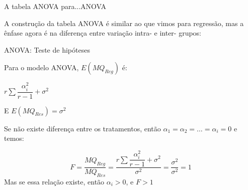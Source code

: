 \documentclass{beamer}\usepackage[]{graphicx}\usepackage[]{color}
\begin{document}
\begin{frame}{A tabela ANOVA para...ANOVA}

A construção da tabela ANOVA é similar ao que vimos para regressão, mas a ênfase agora é na diferença entre variação intra- e inter- grupos:
\vfill


\end{frame}

\begin{frame}{ANOVA: Teste de hipóteses}

Para o modelo ANOVA, $E(MQ_{Reg})$ é:
\vfill

$r\sum \dfrac{\alpha _i^2}{r-1} + \sigma ^2$ \pause
\vfill

E $E(MQ_{Res}) = \sigma^2$  \pause
\vfill

Se não existe diferença entre os tratamentos, então $\alpha _1 = \alpha _2 = \ldots = \alpha_i = 0$ e temos:

\begin{equation*}
F = \frac{MQ_{Reg}}{MQ_{Res}} = \frac{r\sum \dfrac{\alpha _i^2}{r-1} + \sigma ^2}{\sigma ^2} = \frac{\sigma^2}{\sigma^2} = 1
\end{equation*}
\vfill \pause
Mas se essa relação existe, então $\alpha _i > 0$, e $F > 1$

\end{frame}
\end{document}
